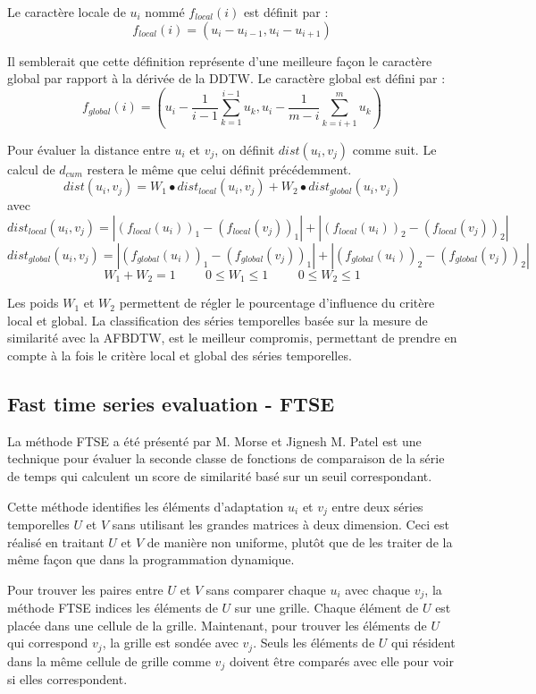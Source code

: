 Le caractère locale de $u_i$ nommé $f_{local}(i)$ est définit par : 
$$f_{local}(i) = (u_i - u_{i-1}, u_i - u_{i+1} )$$

Il semblerait que cette définition représente d’une meilleure façon le caractère global par rapport à la dérivée de la DDTW. Le caractère global est défini par :
$$f_{global}(i) = (u_i - \frac{1}{i-1} \sum_{k = 1}^{i - 1} {u_k}, u_i -  \frac{1}{m - i} \sum_{k = i + 1}^{m} {u_k} ) $$

Pour évaluer la distance entre $u_i$ et $v_j$, on définit $dist(u_i, v_j)$ comme suit. Le calcul de $d_{cum}$ restera le même que celui définit précédemment.
$$dist(u_i, v_j) = W_1 \bullet dist_{local} (u_i, v_j) + W_2 \bullet dist_{global}(u_i, v_j)$$
avec 
$$dist_{local} (u_i, v_j) = | (f_{local}(u_i))_1 - (f_{local}(v_j))_1  | + | (f_{local}(u_i))_2 - (f_{local}(v_j))_2  | $$
$$dist_{global}(u_i, v_j) = | (f_{global}(u_i))_1 - (f_{global}(v_j))_1  | + | (f_{global}(u_i))_2 - (f_{global}(v_j))_2  | $$
$$W_1 + W_2 = 1 \hspace{1cm} 0 \leq W_1 \leq 1 \hspace{1cm} 0 \leq W_2 \leq 1$$

Les poids $W_1$ et $W_2$ permettent de régler le pourcentage d’influence du critère local et global. La classification des séries temporelles basée sur la mesure de similarité avec la AFBDTW, est le meilleur compromis, permettant de prendre en compte à la fois le critère local et global des séries temporelles.
\subsection{Fast time series evaluation - FTSE}
La méthode FTSE a été présenté par M. Morse et Jignesh M. Patel \cite{morse2007} est une technique pour évaluer la seconde classe de fonctions de comparaison de la série de temps qui calculent un score de similarité basé sur un seuil correspondant.

Cette méthode identifies les éléments d’adaptation $u_i$ et $v_j$ entre deux séries temporelles $U$ et $V$ sans utilisant les grandes matrices à deux dimension. Ceci est réalisé en traitant $U$ et $V$ de manière non uniforme, plutôt que de les traiter de la même façon que dans la programmation dynamique.

Pour trouver les paires entre $U$ et $V$ sans comparer chaque $u_i$ avec chaque $v_j$, la méthode FTSE indices les éléments de $U$ sur une grille. Chaque élément de $U$ est placée dans une cellule de la grille. Maintenant, pour trouver les éléments de $U$ qui correspond $v_j$, la grille est sondée avec $v_j$. Seuls les éléments de $U$ qui résident dans la même cellule de
grille comme $v_j$ doivent être comparés avec elle pour voir si elles correspondent.

